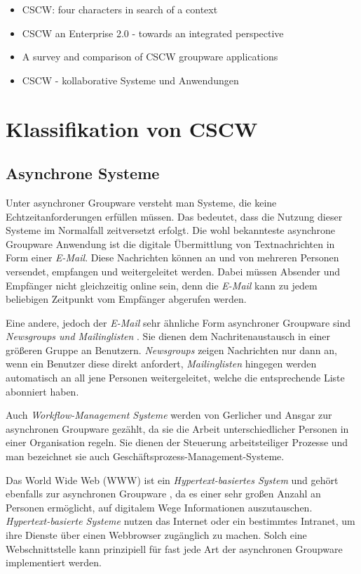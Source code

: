 	

\begin{itemize}
	\item {CSCW: four characters in search of a context}
	\item {CSCW an Enterprise 2.0 - towards an integrated perspective}
	\item {A survey and comparison of CSCW groupware applications}
	\item {CSCW - kollaborative Systeme und Anwendungen}
\end{itemize}

\section{Klassifikation von CSCW}
\subsection{Asynchrone Systeme}

Unter asynchroner Groupware versteht man Systeme, die keine Echtzeitanforderungen erfüllen müssen. Das bedeutet, dass die Nutzung dieser Systeme im Normalfall zeitversetzt erfolgt. Die wohl bekannteste asynchrone Groupware Anwendung ist die digitale Übermittlung von Textnachrichten in Form einer \emph{E-Mail}. Diese Nachrichten können an und von mehreren Personen versendet, empfangen und weitergeleitet werden. Dabei müssen Absender und Empfänger nicht gleichzeitig online sein, denn die \emph{E-Mail} kann zu jedem beliebigen Zeitpunkt vom Empfänger abgerufen werden.

Eine andere, jedoch der \emph{E-Mail} sehr ähnliche Form asynchroner Groupware sind \emph{Newsgroups und Mailinglisten} \citep{Gerlicher:2007p241}. Sie dienen dem Nachritenaustausch in einer größeren Gruppe an Benutzern. \emph{Newsgroups} zeigen Nachrichten nur dann an, wenn ein Benutzer diese direkt anfordert, \emph{Mailinglisten} hingegen werden automatisch an all jene Personen weitergeleitet, welche die entsprechende Liste abonniert haben.

Auch \emph{Workflow-Management Systeme} werden von Gerlicher und Ansgar \citep{Gerlicher:2007p241} zur asynchronen Groupware gezählt, da sie die Arbeit unterschiedlicher Personen in einer Organisation regeln. Sie dienen der Steuerung arbeitsteiliger Prozesse und man bezeichnet sie auch Geschäftsprozess-Management-Systeme.

Das World Wide Web (WWW) ist ein \emph{Hypertext-basiertes System} und gehört ebenfalls zur asynchronen Groupware \citep{Gerlicher:2007p241}, da es einer sehr großen Anzahl an Personen ermöglicht, auf digitalem Wege Informationen auszutauschen. \emph{Hypertext-basierte Systeme} nutzen das Internet oder ein bestimmtes Intranet, um ihre Dienste über einen Webbrowser zugänglich zu machen. Solch eine Webschnittstelle kann prinzipiell für fast jede Art der asynchronen Groupware implementiert werden. 

